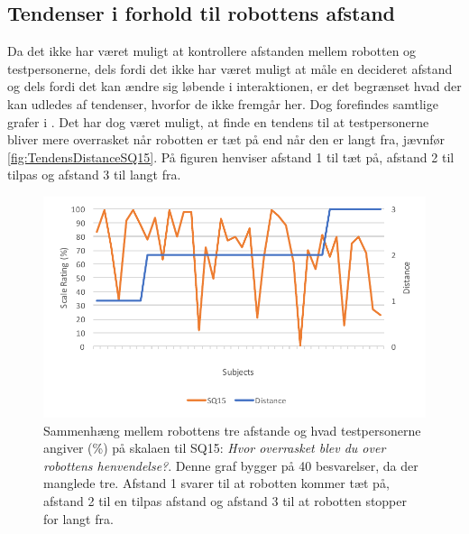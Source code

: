 \subsection{Tendenser i forhold til robottens afstand}
\label{DatabehandlingAfstandTendenser}
%
Da det ikke har været muligt at kontrollere afstanden mellem robotten og testpersonerne, dels fordi det ikke har været muligt at måle en decideret afstand og dels fordi det kan ændre sig løbende i interaktionen, er det begrænset hvad der kan udledes af tendenser, hvorfor de ikke fremgår her. Dog forefindes samtlige grafer i . Det har dog været muligt, at finde en tendens til at testpersonerne bliver mere overrasket når robotten er tæt på end når den er langt fra, jævnfør \autoref{fig:TendensDistanceSQ15}. På figuren henviser afstand 1 til tæt på, afstand 2 til tilpas og afstand 3 til langt fra. 
%
\begin{figure}[H]
\centering
\includegraphics[width=\textwidth]{Figure/DatabehandlingSkalaer/TendensHeight/DistanceSQ15}
\caption{Sammenhæng mellem robottens tre afstande og hvad testpersonerne angiver (\%) på skalaen til SQ15: \textit{Hvor overrasket blev du over robottens henvendelse?}. Denne graf bygger på 40 besvarelser, da der manglede tre. Afstand 1 svarer til at robotten kommer tæt på, afstand 2 til en tilpas afstand og afstand 3 til at robotten stopper for langt fra.}
\label{fig:TendensDistanceSQ15}
\end{figure}
\noindent
%

